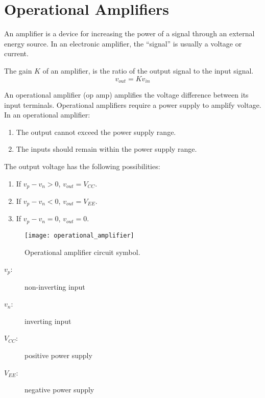 \documentclass{article}
\begin{document}
\section{Operational Amplifiers}
\begin{definition}[Amplifier]
    An amplifier is a device for increasing the power of a signal through an external energy source.
    In an electronic amplifier, the ``signal'' is usually a voltage or current.
\end{definition}
\begin{definition}[Gain]
    The gain $K$ of an amplifier, is the ratio of the output signal to the input signal.
    \begin{equation*}
        v_{out} = K v_{in}
    \end{equation*}
\end{definition}
\begin{definition}
    An operational amplifier (op amp) amplifies the voltage difference between its input terminals.
    Operational amplifiers require a power supply to amplify voltage.
    In an operational amplifier:
    \begin{enumerate}
        \item The output cannot exceed the power supply range.
        \item The inputs should remain within the power supply range.
    \end{enumerate}
    The output voltage has the following possibilities:
    \begin{enumerate}
        \item If $v_p - v_n > 0$, $v_{out} = V_{CC}$.
        \item If $v_p - v_n < 0$, $v_{out} = V_{EE}$.
        \item If $v_p - v_n = 0$, $v_{out} = 0$.
    \end{enumerate}
    \begin{figure}[H]
        \centering
        \texttt{[image: operational\_amplifier]}
        \caption{Operational amplifier circuit symbol.}
    \end{figure}
    \begin{description}
        \item[$v_p$:] non-inverting input
        \item[$v_n$:] inverting input
        \item[$V_{CC}$:] positive power supply
        \item[$V_{EE}$:] negative power supply
    \end{description}
\end{definition}
\end{document}
